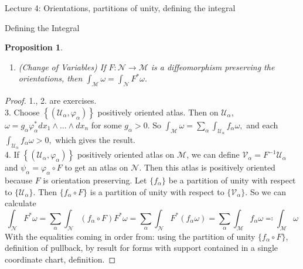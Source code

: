\documentclass[10pt]{article}
\theoremstyle{plain}
\newtheorem{prop}[thm]{Proposition}
\theoremstyle{definition}
\newcommand{\man}{\mathcal{M}}
\newcommand{\nan}{\mathcal{N}}
\newcommand{\chartU}{\mathcal{U}}
\newcommand{\chartV}{\mathcal{V}}
\newcommand{\chart}{\varphi}
\newcommand{\varchart}{\psi}
\newcommand{\alphaatlas}{\left\{(\chartU_\alpha,\chart_\alpha)\right\}}
\newcommand{\allthewedge}[3]{{#1}_{#2}\wedge...\wedge{#1}_{#3}}
\newcommand{\dx}{dx}
\newcommand{\sumfromto}[2]{\sum\limits_{#1}^{#2}}
\begin{document}
\begin{section}{Lecture 4: Orientations, partitions of unity, defining the integral}
\begin{subsection}{Defining the Integral}
\begin{prop}
\begin{enumerate}
    \item (Change of Variables) If $F : \nan \to \man $ is a diffeomorphism preserving the orientations, then $\int_\man \omega = \int_\nan F^*\omega$.
\end{enumerate}
\end{prop}
\begin{proof}
1., 2. are exercises.\\
3. Choose $\alphaatlas$ positively oriented atlas. Then on $\chartU_\alpha$, $\omega = g_\alpha \chart ^*_\alpha \allthewedge{\dx}{1}{n}$ for some $g_\alpha > 0$. So $\int_\man \omega = \sumfromto{\alpha}{}\int_{\chartU_\alpha} f_\alpha \omega, $ and each $\int_{\chartU_\alpha} f_\alpha\omega > 0,$ which gives the result.\\
4. If $\alphaatlas$ positively oriented atlas on $\man$, we can define $\chartV_\alpha = F^{-1}\chartU_\alpha$ and $\varchart_\alpha = \chart_\alpha \circ F$ to get an atlas on $\nan.$ Then this atlas is positively oriented because $F$ is orientation preserving. Let $\{f_\alpha\}$ be a partition of unity with respect to $\{\chartU_\alpha\}$. Then $\{f_\alpha \circ F\}$ is a partition of unity with respect to $\{\chartV_\alpha\}$. So we can calculate 
$$\int_\nan F^*\omega = \sumfromto{\alpha}{}\int_\nan (f_\alpha \circ F) F^*\omega = \sumfromto{\alpha}{} \int_\nan F^*(f_\alpha \omega) = \sumfromto{\alpha}{} \int_\man f_\alpha \omega \eqqcolon \int_\man \omega$$ With the equalities coming in order from: using the partition of unity $\{f_\alpha \circ F\}$, definition of pullback, by result for forms with support contained in a single coordinate chart, definition.
\end{proof}
\end{subsection}
\end{section}
\end{document}

